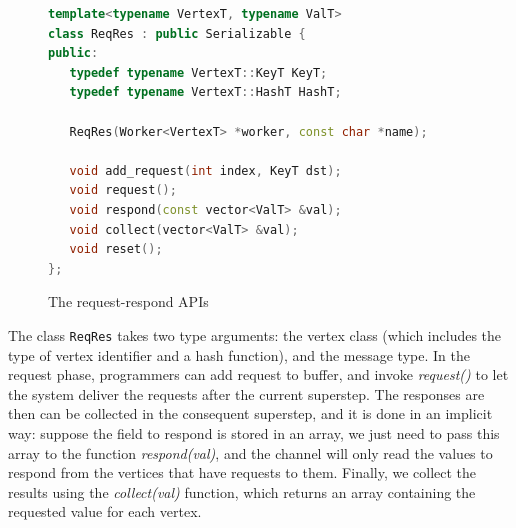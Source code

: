 \documentclass{sokendai_thesis} %
\begin{document}
\begin{figure}[ht]
\centering
\vspace{-2ex}
\begin{lstlisting}[basicstyle=\small\ttfamily,numbers=none,language=c++]
template<typename VertexT, typename ValT>
class ReqRes : public Serializable {
public:
   typedef typename VertexT::KeyT KeyT;
   typedef typename VertexT::HashT HashT;

   ReqRes(Worker<VertexT> *worker, const char *name);

   void add_request(int index, KeyT dst);
   void request();
   void respond(const vector<ValT> &val);
   void collect(vector<ValT> &val);
   void reset();
};
\end{lstlisting}
\vspace{-2ex}
\caption{The request-respond APIs}
\label{fig:api-reqresp}
\end{figure}

The class \texttt{ReqRes} takes two type arguments: the vertex class (which includes the type of vertex identifier and a hash function), and the message type.
In the request phase, programmers can add request to buffer, and invoke \emph{request()} to let the system deliver the requests after the current superstep.
The responses are then can be collected in the consequent superstep, and it is done in an implicit way: suppose the field to respond is stored in an array, we just need to pass this array to the function \emph{respond(val)}, and the channel will only read the values to respond from the vertices that have requests to them.
Finally, we collect the results using the \emph{collect(val)} function, which returns an array containing the requested value for each vertex.

\end{document}

